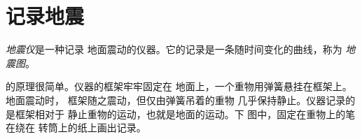 \section{记录地震}

\begin{definition}[地震仪与地震图]\label{def:g7:earthquakes:seismometer}
\emph{地震仪}是一种记录
地面震动的仪器。它的记录是一条随时间变化的曲线，称为
\emph{地震图}。
\end{definition}

的原理很简单。仪器的框架牢牢固定在
地面上，一个重物用弹簧悬挂在框架上。地面震动时，
框架随之震动，但仅由弹簧吊着的重物
几乎保持静止。仪器记录的是框架相对于
静止重物的运动，也就是地面的运动。下
图中，固定在重物上的笔在绕在
转筒上的纸上画出记录。

